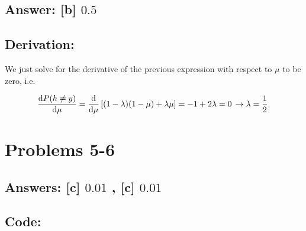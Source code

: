 \documentclass[11pt]{article}
\begin{document}
\hypertarget{answer-b-0.5}{%
\subsection{\texorpdfstring{Answer: {[}b{]}
\(0.5\)}{Answer: {[}b{]} 0.5}}\label{answer-b-0.5}}

\hypertarget{derivation}{%
\subsection{Derivation:}\label{derivation}}

We just solve for the derivative of the previous expression with respect
to \(\mu\) to be zero, i.e.

\[
\frac{{\rm d}P(h\neq y)}{{\rm d}\mu} = \frac{{\rm d}}{{\rm d}\mu}\left[(1-\lambda)(1-\mu)+\lambda\mu\right]=-1+2\lambda=0\,\rightarrow \lambda=\frac
{1}{2}.
\]

    \hypertarget{problems-5-6}{%
\section{Problems 5-6}\label{problems-5-6}}

\hypertarget{answers-c-0.01-c-0.01}{%
\subsection{\texorpdfstring{Answers: {[}c{]} \(0.01\) , {[}c{]}
\(0.01\)}{Answers: {[}c{]} 0.01 , {[}c{]} 0.01}}\label{answers-c-0.01-c-0.01}}

\hypertarget{code}{%
\subsection{Code:}\label{code}}
\end{document}
